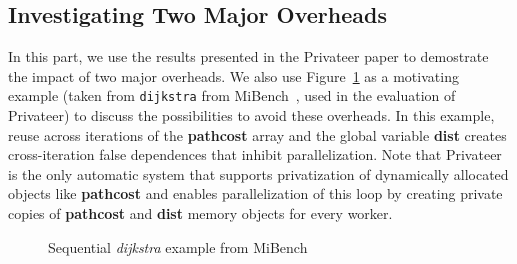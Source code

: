 \subsection{Investigating Two Major Overheads}
In this part, we use the results presented in the Privateer paper to
demostrate the impact of two major overheads. We also use
Figure~\ref{fig:dijkstra_motivation} as a motivating example (taken from
\texttt{dijkstra} from MiBench~\cite{}, used in the evaluation of
Privateer) to discuss the possibilities to avoid these overheads. In this
example, reuse across iterations of the \textbf{pathcost} array and the
global variable \textbf{dist} creates cross-iteration false dependences
that inhibit parallelization. Note that Privateer~\cite{Johnson:12:plid} is
the only automatic system that supports privatization of dynamically
allocated objects like \textbf{pathcost} and enables parallelization of
this loop by creating private copies of \textbf{pathcost} and \textbf{dist}
memory objects for every worker.

\lstset{basicstyle=\ttfamily, numbers=left, numberstyle=\tiny,
  stepnumber=1, numbersep=5pt}
\begin{figure}[t]
  \centering
  \scriptsize
    \subfloat{
    \begin{minipage}{5cm}
      
    \end{minipage}
%
%
%

%
%
%

}
\caption{Sequential \textit{dijkstra} example from MiBench~\cite{}}
\label{fig:dijkstra_motivation}
\end{figure}


